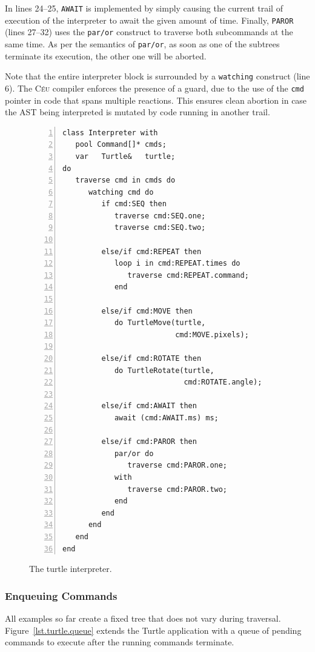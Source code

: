 \documentclass{acm_proc_article-sp}
\newcommand{\CEU}{\textsc{C\'{e}u}\xspace}
\newcommand{\code}[1] {{\small{\texttt{#1}}}}
\begin{document}
In lines 24--25, \code{AWAIT} is implemented by simply causing the current
trail of execution of the interpreter to await the given amount of time.
Finally, \code{PAROR} (lines 27--32) uses the \code{par/or} construct
to traverse both subcommands at the same time. As per the semantics of
\code{par/or}, as soon as one of the subtrees terminate its execution,
the other one will be aborted.

Note that the entire interpreter block is surrounded by a \code{watching}
construct (line 6). The \CEU compiler enforces the presence of a guard, 
due to the use of the \code{cmd} pointer in code that spans multiple
reactions. This ensures clean abortion in case the AST being interpreted
is mutated by code running in another trail.

\begin{figure}%
\begin{lstlisting}[numbers=left,xleftmargin=3em]
class Interpreter with
   pool Command[]* cmds;
   var   Turtle&   turtle;
do
   traverse cmd in cmds do
      watching cmd do
         if cmd:SEQ then
            traverse cmd:SEQ.one;
            traverse cmd:SEQ.two;

         else/if cmd:REPEAT then
            loop i in cmd:REPEAT.times do
               traverse cmd:REPEAT.command;
            end

         else/if cmd:MOVE then
            do TurtleMove(turtle,
                          cmd:MOVE.pixels);

         else/if cmd:ROTATE then
            do TurtleRotate(turtle,
                            cmd:ROTATE.angle);

         else/if cmd:AWAIT then
            await (cmd:AWAIT.ms) ms;

         else/if cmd:PAROR then
            par/or do
               traverse cmd:PAROR.one;
            with
               traverse cmd:PAROR.two;
            end
         end
      end
   end
end
\end{lstlisting}
\caption{ The turtle interpreter.
\label{lst.turtle.interpreter}
}
\end{figure}

\subsubsection{Enqueuing Commands}
\label{sub.enqueuing}

All examples so far create a fixed tree that does not vary during traversal.
%
Figure~\ref{lst.turtle.queue} extends the Turtle application with a queue of 
pending commands to execute after the running commands terminate.
\end{document}
